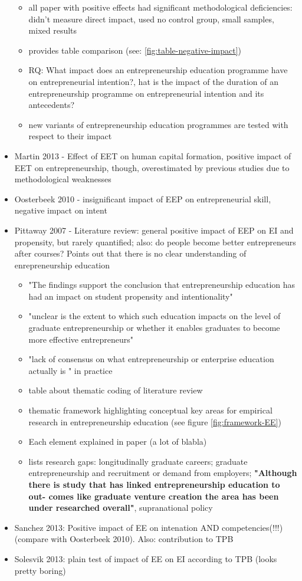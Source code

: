 \begin{itemize}
\begin{itemize}
\item all paper with positive effects had significant methodological deficiencies: didn't measure direct impact, used no control group, small samples, mixed results
\item provides table comparison (see: \ref{fig:table-negative-impact})
\item RQ: What impact does an entrepreneurship education programme have on entrepreneurial intention?, hat is the impact of the duration of an entrepreneurship programme on entrepreneurial intention and its antecedents?
\item new variants of entrepreneurship education programmes are tested with respect to their impact
\end{itemize}

\item Martin 2013 - Effect of EET on human capital formation, positive impact of EET on entrepreneurship, though, overestimated by previous studies due to methodological weaknesses
\item Oosterbeek 2010 - insignificant impact of EEP on entrepreneurial skill, negative impact on intent
\item Pittaway 2007 - Literature review: general positive impact of EEP on EI and propensity, but rarely quantified; also: do people become better entrepreneurs after courses? Points out that there is no clear understanding of enrepreneurship education
\begin{itemize}
\item "The findings support the conclusion that entrepreneurship education has had an impact on student propensity and intentionality"
\item "unclear is the extent
to which such education impacts on the level of graduate entrepreneurship or whether it enables graduates to become more effective entrepreneurs"
\item "lack of consensus on what entrepreneurship or enterprise education actually is " in practice
\item table about thematic coding of literature review
\item thematic framework highlighting conceptual key areas for empirical research in entrepreneurship education (see figure \ref{fig:framework-EE})
\item Each element explained in paper (a lot of blabla)
\item lists research gaps: longitudinally graduate careers; graduate entrepreneurship and recruitment or demand from employers; \textbf{"Although there is study that has linked entrepreneurship education to out- comes like graduate venture creation the area has been under researched overall"}, supranational policy
\end{itemize}
\item Sanchez 2013: Positive impact of EE on intenation AND competencies(!!!) (compare with Oosterbeek 2010). Also: contribution to TPB
\item Solesvik 2013: plain test of impact of EE on EI according to TPB (looks pretty boring)


\end{itemize}
